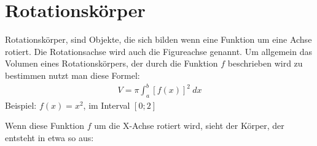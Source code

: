 \section{Rotationskörper}

\begin{flushleft}
    Rotationskörper, sind Objekte, die sich bilden wenn eine Funktion um eine Achse rotiert.
    Die Rotationsachse wird auch die Figureachse genannt.
    Um allgemein das Volumen eines Rotationskörpers, der durch die Funktion $f$ beschrieben wird zu bestimmen nutzt man diese Formel:
    \begin{align}
        V=\pi\int_{a}^{b}\left[f(x)\right]^2 \ dx
    \end{align}
    Beispiel: $f(x)=x^2$, im Interval $[0;2]$
\end{flushleft}

\begin{center}
\end{center}

\begin{flushleft}
    Wenn diese Funktion $f$ um die X-Achse rotiert wird, sieht der Körper, der entsteht in etwa so aus:
\end{flushleft}

\begin{center}
\end{center}

